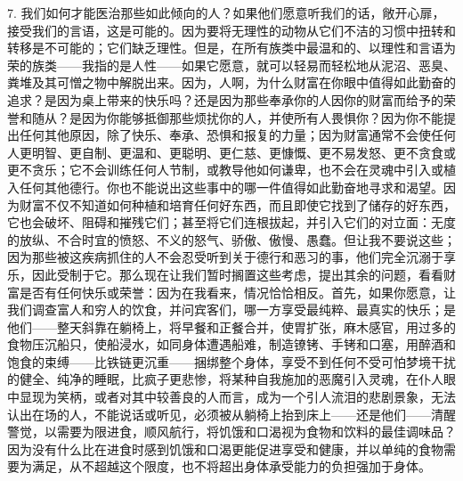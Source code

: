 7. 我们如何才能医治那些如此倾向的人？如果他们愿意听我们的话，敞开心扉，接受我们的言语，这是可能的。因为要将无理性的动物从它们不洁的习惯中扭转和转移是不可能的；它们缺乏理性。但是，在所有族类中最温和的、以理性和言语为荣的族类——我指的是人性——如果它愿意，就可以轻易而轻松地从泥沼、恶臭、粪堆及其可憎之物中解脱出来。因为，人啊，为什么财富在你眼中值得如此勤奋的追求？是因为桌上带来的快乐吗？还是因为那些奉承你的人因你的财富而给予的荣誉和随从？是因为你能够抵御那些烦扰你的人，并使所有人畏惧你？因为你不能提出任何其他原因，除了快乐、奉承、恐惧和报复的力量；因为财富通常不会使任何人更明智、更自制、更温和、更聪明、更仁慈、更慷慨、更不易发怒、更不贪食或更不贪乐；它不会训练任何人节制，或教导他如何谦卑，也不会在灵魂中引入或植入任何其他德行。你也不能说出这些事中的哪一件值得如此勤奋地寻求和渴望。因为财富不仅不知道如何种植和培育任何好东西，而且即使它找到了储存的好东西，它也会破坏、阻碍和摧残它们；甚至将它们连根拔起，并引入它们的对立面：无度的放纵、不合时宜的愤怒、不义的怒气、骄傲、傲慢、愚蠢。但让我不要说这些；因为那些被这疾病抓住的人不会忍受听到关于德行和恶习的事，他们完全沉溺于享乐，因此受制于它。那么现在让我们暂时搁置这些考虑，提出其余的问题，看看财富是否有任何快乐或荣誉：因为在我看来，情况恰恰相反。首先，如果你愿意，让我们调查富人和穷人的饮食，并问宾客们，哪一方享受最纯粹、最真实的快乐；是他们——整天斜靠在躺椅上，将早餐和正餐合并，使胃扩张，麻木感官，用过多的食物压沉船只，使船浸水，如同身体遭遇船难，制造镣铐、手铐和口塞，用醉酒和饱食的束缚——比铁链更沉重——捆绑整个身体，享受不到任何不受可怕梦境干扰的健全、纯净的睡眠，比疯子更悲惨，将某种自我施加的恶魔引入灵魂，在仆人眼中显现为笑柄，或者对其中较善良的人而言，成为一个引人流泪的悲剧景象，无法认出在场的人，不能说话或听见，必须被从躺椅上抬到床上——还是他们——清醒警觉，以需要为限进食，顺风航行，将饥饿和口渴视为食物和饮料的最佳调味品？因为没有什么比在进食时感到饥饿和口渴更能促进享受和健康，并以单纯的食物需要为满足，从不超越这个限度，也不将超出身体承受能力的负担强加于身体。\par

